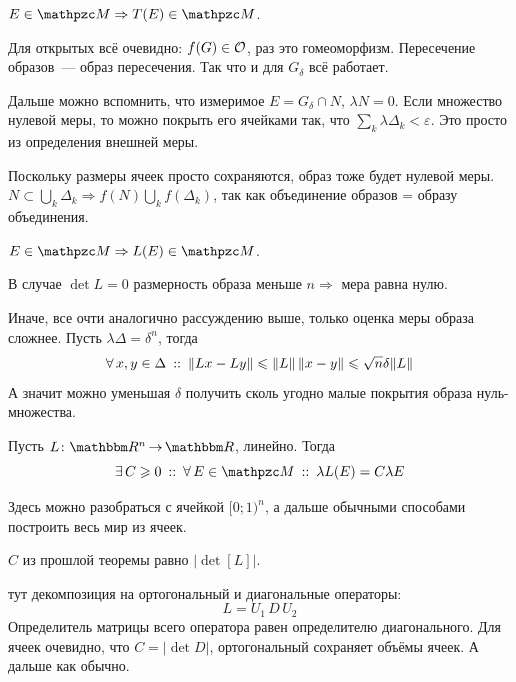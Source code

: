\documentclass[draft, timbord]{longnotes}
\begin{document}
\begin{stat}\label{stat:meas::aff::shiftmeas}
  $E \in \lebesgue \Rightarrow T(E) \in \lebesgue$. 
\end{stat}
\begin{lproof}
  Для открытых всё очевидно: $f(G) \in \mathcal O$, раз это гомеоморфизм. 
  Пересечение образов~--- образ пересечения. Так что и для $G_\delta$ всё работает.

  Дальше можно вспомнить, что измеримое $E= G_\delta \cap N$, $\lambda N = 0$.
  Если множество нулевой меры, то можно покрыть его ячейками так, что 
  $\sum_k \lambda\Delta_k < \varepsilon$. Это просто из определения внешней меры.

  Поскольку размеры ячеек просто сохраняются, образ тоже будет нулевой меры.
  $N \subset \bigcup_k \Delta_k \Rightarrow f(N) \bigcup_k f(\Delta_k)$, так как объединение
  образов = образу объединения.
\end{lproof}
\begin{stat}\label{stat:meas::aff::linmeas}
  $E \in \lebesgue \Rightarrow L(E) \in \lebesgue$. 
\end{stat}
\begin{lproof}
  В случае $\det L = 0$ размерность образа меньше $n \Rightarrow $ мера равна нулю.

  Иначе, все очти аналогично рассуждению выше, только оценка меры образа сложнее.
  Пусть $\lambda \Delta = \delta ^n$, тогда
  \[
    \forall\, x, y \in \Delta \:::\: \|Lx - Ly\| \leqslant \|L\|\, \|x - y\| 
    \leqslant \sqrt{n} \delta \|L\|
  \]
  А значит можно уменьшая $\delta$ получить сколь угодно малые покрытия образа нуль-множества.
\end{lproof}


\begin{stat}\label{stat:meas::aff::disturb}
  Пусть $L \colon \R^n \to \R$, линейно. Тогда 
  \[
    \exists\, C \geqslant 0 \that \forall\, E \in \lebesgue \holds \lambda L(E) = C \lambda E
  \]
\end{stat}
\begin{lproof}
  Здесь можно разобраться с ячейкой $[0;1)^n$, а дальше обычными способами построить весь мир 
  из ячеек.
\end{lproof}

\begin{thrm}\label{thrm:meas::aff::deter}
  $C$ из прошлой теоремы равно $\bigl|\det [L]\bigr|$.
\end{thrm}
\begin{tproof}
  тут декомпозиция на ортогональный и диагональные операторы:
  \[
    L = U_1 \, D \, U_2
  \]
  Определитель матрицы всего оператора равен определителю диагонального. Для ячеек очевидно, что
  $C = |\det D|$, ортогональный сохраняет объёмы ячеек. А дальше как обычно.
\end{tproof}
\end{document}
